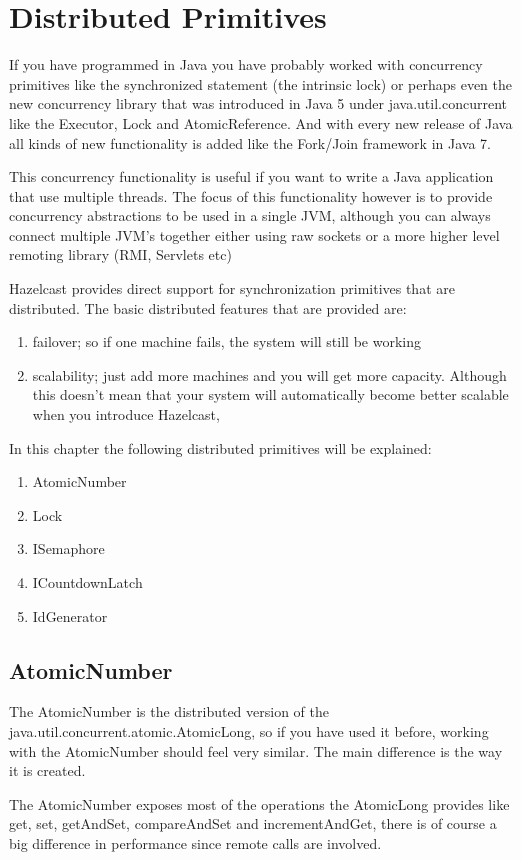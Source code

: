\chapter{Distributed Primitives}

If you have programmed in Java you have probably worked with concurrency primitives like the synchronized statement (the intrinsic lock) or perhaps even the new concurrency library that was introduced in Java 5 under java.util.concurrent like the Executor, Lock and AtomicReference. And with every new release of Java all kinds of new functionality is added like the Fork/Join framework in Java 7.

This concurrency functionality is useful if you want to write a Java application that use multiple threads. The focus of this functionality however is to provide concurrency abstractions to be used in a single JVM, although you can always connect multiple JVM's together either using raw sockets or a more higher level remoting library (RMI, Servlets etc)

Hazelcast provides direct support for synchronization primitives that are distributed. The basic distributed features that are provided are:
\begin{enumerate}
\item failover; so if one machine fails, the system will still be working
\item scalability; just add more machines and you will get more capacity. Although this doesn't mean that your system will automatically become better scalable when you introduce Hazelcast, 
\end{enumerate}
In this chapter the following distributed primitives will be explained:
\begin{enumerate}
\item AtomicNumber
\item Lock
\item ISemaphore
\item ICountdownLatch
\item IdGenerator
\end{enumerate}
\section{AtomicNumber}
The AtomicNumber is the distributed version of the java.util.concurrent.atomic.AtomicLong, so if you have used it before, working with the AtomicNumber should feel very similar. The main difference is the way it is created.

The AtomicNumber exposes most of the operations the AtomicLong provides like get, set, getAndSet, compareAndSet and incrementAndGet, there is of course a big difference in performance since remote calls are involved.


